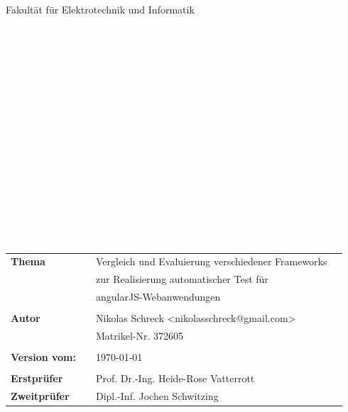 \begin{center}
	\Large{Fakultät für Elektrotechnik und Informatik}
\end{center}
\begin{verbatim}




\end{verbatim}
\begin{center}
	\doublespacing
	\textbf{\LARGE{\titleDocument}}\\
	\singlespacing
	\begin{verbatim}
	
	\end{verbatim}
	\textbf{{~\subjectDocument~}}
\end{center}
\begin{verbatim}

\end{verbatim}
\begin{center}
	
\end{center}
\begin{verbatim}







\end{verbatim}
\begin{flushleft}
	\begin{tabular}{llll}
		\textbf{Thema} & & Vergleich und Evaluierung verschiedener Frameworks & \\
		& & zur Realisierung automatischer Test für & \\
		& &  angularJS-Webanwendungen  & \\
		& & \\
		\textbf{Autor} & & Nikolas Schreck <nikolasschreck@gmail.com> & \\
		& & Matrikel-Nr. 372605 & \\
		& & \\
		\textbf{Version vom:} & & \today &\\
		& & \\
		\textbf{Erstprüfer} & & Prof. Dr.-Ing. Heide-Rose Vatterrott &\\
		\textbf{Zweitprüfer} & & Dipl.-Inf. Jochen Schwitzing &\\
	\end{tabular}
\end{flushleft}